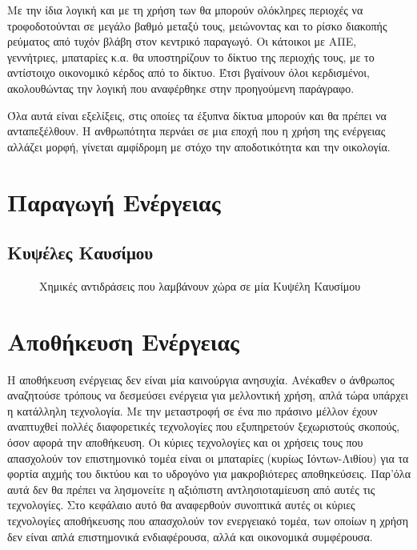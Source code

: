 \documentclass[12pt]{report}
\begin{document}
Με την ίδια λογική και με τη χρήση των {} θα μπορούν ολόκληρες περιοχές να τροφοδοτούνται σε μεγάλο βαθμό μεταξύ τους, μειώνοντας και το ρίσκο διακοπής ρεύματος από τυχόν βλάβη στον κεντρικό παραγωγό. 
Οι κάτοικοι με ΑΠΕ, γεννήτριες, μπαταρίες κ.α. θα υποστηρίζουν το δίκτυο της περιοχής τους, με το αντίστοιχο οικονομικό κέρδος από το δίκτυο. Έτσι βγαίνουν όλοι κερδισμένοι, ακολουθώντας την λογική που αναφέρθηκε
στην προηγούμενη παράγραφο.

Όλα αυτά είναι εξελίξεις, στις οποίες τα έξυπνα δίκτυα μπορούν και θα πρέπει να ανταπεξέλθουν. Η ανθρωπότητα περνάει σε μια εποχή που η χρήση της ενέργειας αλλάζει μορφή, γίνεται αμφίδρομη με στόχο την αποδοτικότητα
και την οικολογία.
\chapter{Παραγωγή Ενέργειας}
\section{Κυψέλες Καυσίμου}

\begin{figure}
\center
		{}
\captionsetup{width=0.8\textwidth}
\caption{Χημικές αντιδράσεις που λαμβάνουν χώρα σε μία Κυψέλη Καυσίμου}
\label{eq:fuelcell}
\end{figure}

\chapter{Αποθήκευση Ενέργειας}
\label{chap:storage}
Η αποθήκευση ενέργειας δεν είναι μία καινούργια ανησυχία. Ανέκαθεν ο άνθρωπος αναζητούσε τρόπους να δεσμεύσει ενέργεια για μελλοντική χρήση, απλά τώρα υπάρχει η κατάλληλη τεχνολογία. 
Με την μεταστροφή σε ένα πιο πράσινο μέλλον έχουν αναπτυχθεί πολλές διαφορετικές τεχνολογίες που εξυπηρετούν ξεχωριστούς σκοπούς, όσον αφορά την αποθήκευση. Οι κύριες τεχνολογίες και οι χρήσεις τους που απασχολούν
τον επιστημονικό τομέα
είναι οι μπαταρίες (κυρίως Ιόντων-Λιθίου) για τα φορτία αιχμής του δικτύου και το υδρογόνο για μακροβιότερες αποθηκεύσεις. Παρ'όλα αυτά δεν θα πρέπει να λησμονείτε η αξιόπιστη αντλησιοταμίευση από αυτές τις τεχνολογίες. 
Στο κεφάλαιο αυτό θα αναφερθούν συνοπτικά αυτές οι κύριες τεχνολογίες αποθήκευσης που απασχολούν τον ενεργειακό τομέα, των οποίων η χρήση δεν είναι απλά επιστημονικά ενδιαφέρουσα, αλλά και οικονομικά συμφέρουσα.
\end{document}
